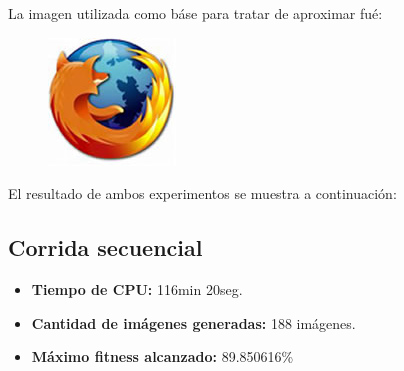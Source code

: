 \documentclass[11pt, spanish]{article}
\begin{document}
La imagen utilizada como báse para tratar de aproximar fué:

\begin{figure}[htp]
  \centering
  \includegraphics{media/firefox.jpg}
\end{figure}

El resultado de ambos experimentos se muestra a continuación:

\subsection{Corrida secuencial}
\label{sec:cor-secuencial}

\begin{itemize}
\item \textbf{Tiempo de CPU:} 116min 20seg.
\item \textbf{Cantidad de imágenes generadas:} 188 imágenes.
\item \textbf{Máximo fitness alcanzado:} 89.850616\%
\end{itemize}
\end{document}
